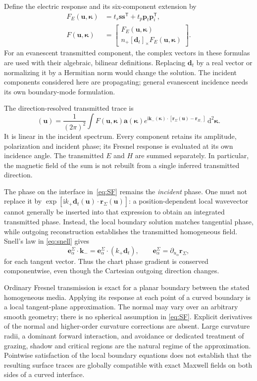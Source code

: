 \documentclass[11pt,a4paper]{article}
\newcommand{\vct}[1]{\bm{#1}}
\newcommand{\kap}{\vct\kappa}
\newcommand{\dd}{\mathrm d}
\newcommand{\ii}{\mathrm i}
\newcommand{\cross}[1]{[#1]_{\times}}
\newcommand{\SF}{\mathcal S_{\mathrm F}}
\numberwithin{equation}{section}
\begin{document}
Define the electric response and its six-component extension by
\begin{align}
 F_E(\vct u,\kap)&=
 t_s\vct s\vct s^{\mathsf T}+t_p\vct p_t\vct p_i^{\mathsf T},\\
 F(\vct u,\kap)&=
 \begin{bmatrix}F_E(\vct u,\kap)\\
 n_+\cross{\vct d_t}F_E(\vct u,\kap)\end{bmatrix}.
 \label{eq:symbol}
\end{align}
For an evanescent transmitted component, the complex vectors in these formulas
are used with their algebraic, bilinear definitions. Replacing $\vct d_t$ by a
real vector or normalizing it by a Hermitian norm would change the solution.
The incident components considered here are propagating; general evanescent
incidence needs its own boundary-mode formulation.

The direction-resolved transmitted trace is
\begin{equation}
 [\SF\vct a](\vct u)=\frac{1}{(2\pi)^2}\int
 F(\vct u,\kap)\vct a(\kap)
 e^{\ii\vct k_-(\kap)\cdot[\vct r_\Sigma(\vct u)-\vct r_{\Pi_-}]}
 \,\dd^2\kap.
 \label{eq:SF}
\end{equation}
It is linear in the incident spectrum. Every component retains its amplitude,
polarization and incident phase; its Fresnel response is evaluated at its own
incidence angle. The transmitted $E$ and $H$ are summed separately. In
particular, the magnetic field of the sum is not rebuilt from a single
inferred transmitted direction.

The phase on the interface in~\eqref{eq:SF} remains the \emph{incident} phase.
One must not replace it by
$\exp[\ii k_+\vct d_t(\vct u)\cdot\vct r_\Sigma(\vct u)]$:
a position-dependent local wavevector cannot generally be inserted into that
expression to obtain an integrated transmitted phase. Instead, the local
boundary solution matches tangential phase, while outgoing reconstruction
establishes the transmitted homogeneous field. Snell's law in
\eqref{eq:snell} gives
\begin{equation}
 \vct e_\alpha^{\Sigma}\cdot\vct k_-
 =\vct e_\alpha^{\Sigma}\cdot(k_+\vct d_t),
 \qquad \vct e_\alpha^{\Sigma}=\partial_{u_\alpha}\vct r_\Sigma,
 \label{eq:tangentmatching}
\end{equation}
for each tangent vector. Thus the chart phase gradient is conserved
componentwise, even though the Cartesian outgoing direction changes.

Ordinary Fresnel transmission is exact for a planar boundary between the
stated homogeneous media. Applying its response at each point of a curved
boundary is a local tangent-plane approximation. The normal may vary over an
arbitrary smooth geometry; there is no spherical assumption in
\eqref{eq:SF}. Explicit derivatives of the normal and higher-order curvature
corrections are absent. Large curvature radii, a dominant forward interaction,
and avoidance or dedicated treatment of grazing, shadow and critical regions
are the natural regime of the approximation. Pointwise satisfaction of the
local boundary equations does not establish that the resulting surface traces
are globally compatible with exact Maxwell fields on both sides of a curved
interface.
\end{document}
